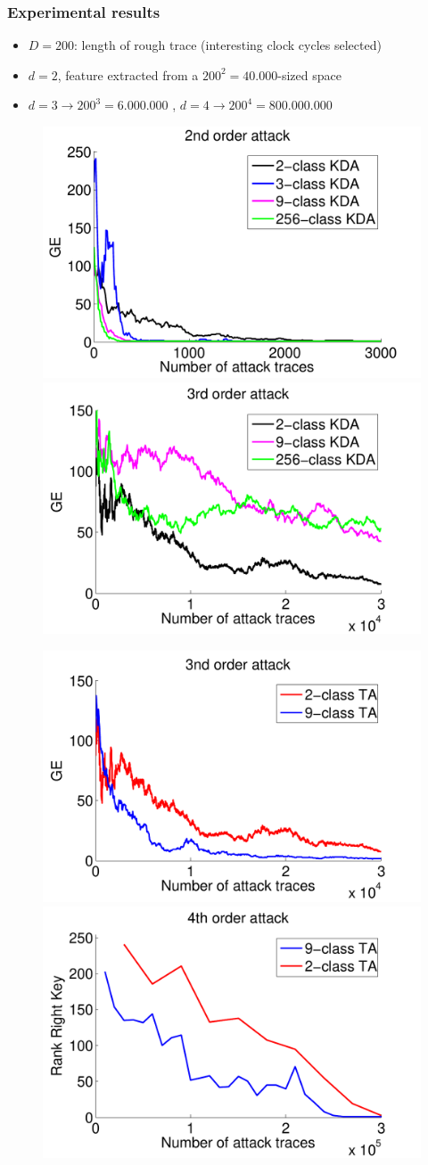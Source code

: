 \begin{frame}
\frametitle{Experimental results}
\begin{itemize}
\item $D = 200$: length of rough trace (interesting clock cycles selected)
\item $d=2$, feature extracted from a $200^2 = 40.000$-sized space
\item $d=3 \rightarrow 200^3=6.000.000$ , $d=4 \rightarrow 200^4 = 800.000.000$
\end{itemize}
\begin{figure}[t]

\includegraphics[width=.4\textwidth]{../Figures/CARDIS2016/2order_classes_TA.pdf}
\includegraphics[width=.4\textwidth]{../Figures/CARDIS2016/3order_new.pdf}
\end{figure}
\vspace{-10pt}
\begin{figure}[t]

\includegraphics[width=.4\textwidth]{../Figures/CARDIS2016/3order_2_9.pdf}
\includegraphics[width=.4\textwidth]{../Figures/CARDIS2016/4order_2_9.pdf}
\end{figure}
\end{frame}